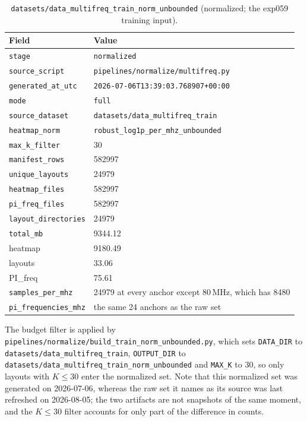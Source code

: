 \begin{table}[htbp]
\centering
\caption{\texttt{datasets/\allowbreak{}data\_\allowbreak{}multifreq\_\allowbreak{}train\_\allowbreak{}norm\_\allowbreak{}unbounded} (normalized; the exp059 training
input).}
\label{tab:appA_norm}
\begin{tabular}{p{} p{}}
\hline
Field & Value \\
\hline
\texttt{stage} & \texttt{normalized} \\
\texttt{source\_script} & \texttt{pipelines/normalize/multifreq.py} \\
\texttt{generated\_at\_utc} & \texttt{2026-07-06T13:39:03.768907+00:00} \\
\texttt{mode} & \texttt{full} \\
\texttt{source\_dataset} & \texttt{\allowbreak datasets/data\_multifreq\_train} \\
\texttt{heatmap\_norm} & \texttt{robust\_\allowbreak{}log1p\_\allowbreak{}per\_\allowbreak{}mhz\_\allowbreak{}unbounded} \\
\texttt{max\_k\_filter} & 30 \\
\texttt{manifest\_rows} & 582997 \\
\texttt{unique\_layouts} & 24979 \\
\texttt{heatmap\_files} & 582997 \\
\texttt{pi\_freq\_files} & 582997 \\
\texttt{layout\_directories} & 24979 \\
\texttt{total\_mb} & 9344.12 \\
\quad heatmap & 9180.49 \\
\quad layouts & 33.06 \\
\quad PI\_freq & 75.61 \\
\texttt{samples\_per\_mhz} & 24979 at every anchor except 80\,MHz, which has 8480 \\
\texttt{pi\_frequencies\_mhz} & the same 24 anchors as the raw set \\
\hline
\end{tabular}
\end{table}

The budget filter is applied by \texttt{pipelines/\allowbreak{}normalize/\allowbreak{}build\_\allowbreak{}train\_\allowbreak{}norm\_\allowbreak{}unbounded.py},
which sets \texttt{DATA\_DIR} to \texttt{datasets/data\_multifreq\_train}, \texttt{OUTPUT\_DIR} to
\texttt{datasets/\allowbreak{}data\_\allowbreak{}multifreq\_\allowbreak{}train\_\allowbreak{}norm\_\allowbreak{}unbounded} and \texttt{MAX\_K} to 30, so only layouts
with $K \le 30$ enter the normalized set. Note that this normalized set was generated on
2026-07-06, whereas the raw set it names as its source was last refreshed on 2026-08-05; the two
artifacts are not snapshots of the same moment, and the $K\le30$ filter accounts for only part of
the difference in counts.


